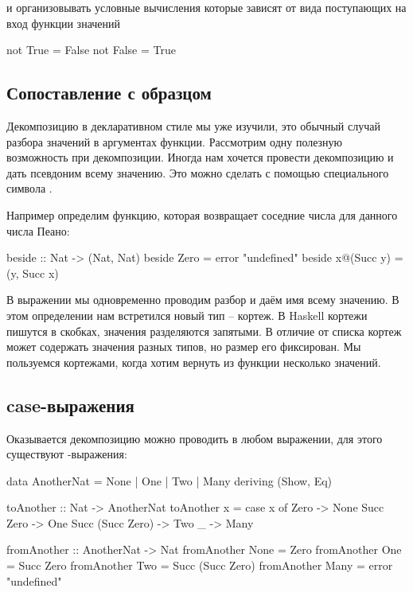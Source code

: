 \noindent и организовывать 
условные вычисления которые зависят от вида поступающих
на вход функции значений

\begin{code}
not True  = False
not False = True
\end{code}

\subsection{Сопоставление с образцом}

Декомпозицию в декларативном стиле мы уже изучили, это
обычный случай разбора значений в аргументах функции.
Рассмотрим одну полезную возможность при декомпозиции.
Иногда нам хочется провести декомпозицию и дать 
псевдоним всему значению. Это можно сделать
с помощью специального символа .

Например определим функцию, которая возвращает соседние
числа для данного числа Пеано:

\begin{code}
beside :: Nat -> (Nat, Nat)
beside  Zero       = error "undefined"
beside  x@(Succ y) = (y, Succ x)
\end{code}

В выражении  мы одновременно проводим
разбор и даём имя всему значению. В этом определении
нам встретился новый тип -- кортеж. В Haskell кортежи
пишутся в скобках, значения разделяются запятыми. 
В отличие от списка кортеж может содержать значения разных
типов, но размер его фиксирован. Мы пользуемся кортежами,
когда хотим вернуть из функции несколько значений. 

\subsection{case-выражения}

Оказывается декомпозицию можно проводить в любом выражении,
для этого существуют  -выражения:

\begin{code}
data AnotherNat = None | One | Two | Many
    deriving (Show, Eq)

toAnother :: Nat -> AnotherNat
toAnother x = 
    case x of
        Zero                -> None
        Succ Zero           -> One
        Succ (Succ Zero)    -> Two
        _                   -> Many

fromAnother :: AnotherNat -> Nat
fromAnother None    = Zero
fromAnother One     = Succ Zero
fromAnother Two     = Succ (Succ Zero)
fromAnother Many    = error "undefined" 
\end{code}

